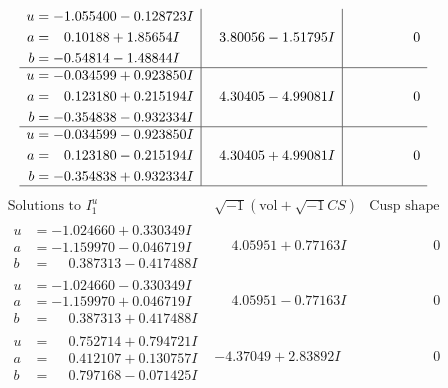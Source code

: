 \documentclass[1p]{elsarticle_modified}
\theoremstyle{definition}
\newcommand{\I}{\sqrt{-1}}
\begin{document}
$$\begin{array}{c|c|c}
\begin{aligned}
u &= -1.055400 - 0.128723 I \\
a &= \phantom{-}0.10188 + 1.85654 I \\
b &= -0.54814 - 1.48844 I\end{aligned}
 & \phantom{-}3.80056 - 1.51795 I & \phantom{-0.000000 } 0 \\ \hline\begin{aligned}
u &= -0.034599 + 0.923850 I \\
a &= \phantom{-}0.123180 + 0.215194 I \\
b &= -0.354838 - 0.932334 I\end{aligned}
 & \phantom{-}4.30405 - 4.99081 I & \phantom{-0.000000 } 0 \\ \hline\begin{aligned}
u &= -0.034599 - 0.923850 I \\
a &= \phantom{-}0.123180 - 0.215194 I \\
b &= -0.354838 + 0.932334 I\end{aligned}
 & \phantom{-}4.30405 + 4.99081 I & \phantom{-0.000000 } 0\\
 \hline 
 \end{array}$$\newpage$$\begin{array}{c|c|c}  
\text{Solutions to }I^u_{1}& \I (\text{vol} + \sqrt{-1}CS) & \text{Cusp shape}\\
 \hline 
\begin{aligned}
u &= -1.024660 + 0.330349 I \\
a &= -1.159970 - 0.046719 I \\
b &= \phantom{-}0.387313 - 0.417488 I\end{aligned}
 & \phantom{-}4.05951 + 0.77163 I & \phantom{-0.000000 } 0 \\ \hline\begin{aligned}
u &= -1.024660 - 0.330349 I \\
a &= -1.159970 + 0.046719 I \\
b &= \phantom{-}0.387313 + 0.417488 I\end{aligned}
 & \phantom{-}4.05951 - 0.77163 I & \phantom{-0.000000 } 0 \\ \hline\begin{aligned}
u &= \phantom{-}0.752714 + 0.794721 I \\
a &= \phantom{-}0.412107 + 0.130757 I \\
b &= \phantom{-}0.797168 - 0.071425 I\end{aligned}
 & -4.37049 + 2.83892 I & \phantom{-0.000000 } 0 \\ \hline\begin{aligned}

\end{aligned}
\end{array}$$
\end{document}
